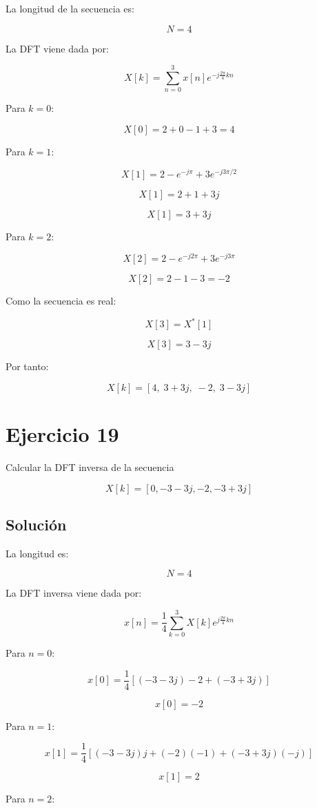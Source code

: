 \documentclass[fleqn]{article}
\begin{document}
	La longitud de la secuencia es:

	\[
	N=4
	\]

	La DFT viene dada por:

	\[
	X[k]
	=
	\sum_{n=0}^{3}
	x[n]e^{-j\frac{2\pi}{4}kn}
	\]

	Para $k=0$:

	\[
	X[0]
	=
	2+0-1+3
	=
	4
	\]

	Para $k=1$:

	\[
	X[1]
	=
	2
	-
	e^{-j\pi}
	+
	3e^{-j3\pi/2}
	\]

	\[
	X[1]
	=
	2+1+3j
	\]

	\[
	X[1]=3+3j
	\]

	Para $k=2$:

	\[
	X[2]
	=
	2
	-
	e^{-j2\pi}
	+
	3e^{-j3\pi}
	\]

	\[
	X[2]
	=
	2-1-3
	=
	-2
	\]

	Como la secuencia es real:

	\[
	X[3]=X^*[1]
	\]

	\[
	X[3]=3-3j
	\]

	Por tanto:

	\[
	\boxed{
	X[k]
	=
	[4,\;3+3j,\;-2,\;3-3j]
	}
	\]

\section{Ejercicio 19}
	Calcular la DFT inversa de la secuencia

	\[
	X[k]
	=
	[0,-3-3j,-2,-3+3j]
	\]

	\subsection{Solución}

	La longitud es:

	\[
	N=4
	\]

	La DFT inversa viene dada por:

	\[
	x[n]
	=
	\frac{1}{4}
	\sum_{k=0}^{3}
	X[k]e^{j\frac{2\pi}{4}kn}
	\]

	Para $n=0$:

	\[
	x[0]
	=
	\frac{1}{4}
	\left[
	(-3-3j)-2+(-3+3j)
	\right]
	\]

	\[
	x[0]=-2
	\]

	Para $n=1$:

	\[
	x[1]
	=
	\frac{1}{4}
	\left[
	(-3-3j)j
	+
	(-2)(-1)
	+
	(-3+3j)(-j)
	\right]
	\]

	\[
	x[1]=2
	\]

	Para $n=2$:
\end{document}
